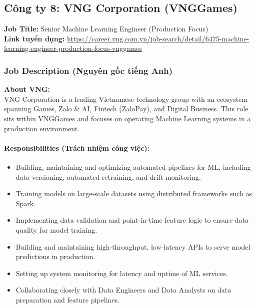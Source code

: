 \subsection{Công ty 8: VNG Corporation (VNGGames)}

\noindent\textbf{Job Title:} Senior Machine Learning Engineer (Production Focus) \\
\textbf{Link tuyển dụng:} \url{https://career.vng.com.vn/job-search/detail/6475-machine-learning-engineer-production-focus-vnggames}

\subsubsection*{Job Description (Nguyên gốc tiếng Anh)}

\textbf{About VNG:} \\
\indent VNG Corporation is a leading Vietnamese technology group with an ecosystem spanning Games, Zalo \& AI, Fintech (ZaloPay), and Digital Business. This role sits within VNGGames and focuses on operating Machine Learning systems in a production environment.

\paragraph{Responsibilities (Trách nhiệm công việc):}
\begin{itemize}
    \item Building, maintaining and optimizing automated pipelines for ML, including data versioning, automated retraining, and drift monitoring.
    \item Training models on large-scale datasets using distributed frameworks such as Spark.
    \item Implementing data validation and point-in-time feature logic to ensure data quality for model training.
    \item Building and maintaining high-throughput, low-latency APIs to serve model predictions in production.
    \item Setting up system monitoring for latency and uptime of ML services.
    \item Collaborating closely with Data Engineers and Data Analysts on data preparation and feature pipelines.
\end{itemize}

